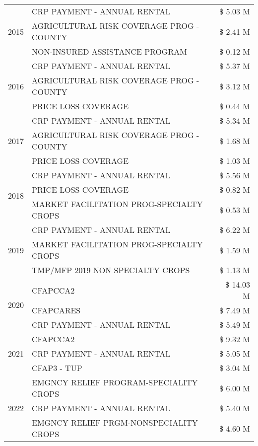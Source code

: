 \begin{tabular}{llr}
\cline{1-3}
\multirow[t]{3}{*}{2015} & CRP PAYMENT - ANNUAL RENTAL & \$ 5.03 M \\
 & AGRICULTURAL RISK COVERAGE PROG - COUNTY & \$ 2.41 M \\
 & NON-INSURED ASSISTANCE PROGRAM & \$ 0.12 M \\
\cline{1-3}
\multirow[t]{3}{*}{2016} & CRP PAYMENT - ANNUAL RENTAL & \$ 5.37 M \\
 & AGRICULTURAL RISK COVERAGE PROG - COUNTY & \$ 3.12 M \\
 & PRICE LOSS COVERAGE & \$ 0.44 M \\
\cline{1-3}
\multirow[t]{3}{*}{2017} & CRP PAYMENT - ANNUAL RENTAL & \$ 5.34 M \\
 & AGRICULTURAL RISK COVERAGE PROG - COUNTY & \$ 1.68 M \\
 & PRICE LOSS COVERAGE & \$ 1.03 M \\
\cline{1-3}
\multirow[t]{3}{*}{2018} & CRP PAYMENT - ANNUAL RENTAL & \$ 5.56 M \\
 & PRICE LOSS COVERAGE & \$ 0.82 M \\
 & MARKET FACILITATION PROG-SPECIALTY CROPS & \$ 0.53 M \\
\cline{1-3}
\multirow[t]{3}{*}{2019} & CRP PAYMENT - ANNUAL RENTAL & \$ 6.22 M \\
 & MARKET FACILITATION PROG-SPECIALTY CROPS & \$ 1.59 M \\
 & TMP/MFP 2019 NON SPECIALTY CROPS & \$ 1.13 M \\
\cline{1-3}
\multirow[t]{3}{*}{2020} & CFAPCCA2 & \$ 14.03 M \\
 & CFAPCARES & \$ 7.49 M \\
 & CRP PAYMENT - ANNUAL RENTAL & \$ 5.49 M \\
\cline{1-3}
\multirow[t]{3}{*}{2021} & CFAPCCA2 & \$ 9.32 M \\
 & CRP PAYMENT - ANNUAL RENTAL & \$ 5.05 M \\
 & CFAP3 - TUP & \$ 3.04 M \\
\cline{1-3}
\multirow[t]{3}{*}{2022} & EMGNCY RELIEF PROGRAM-SPECIALITY CROPS & \$ 6.00 M \\
 & CRP PAYMENT - ANNUAL RENTAL & \$ 5.40 M \\
 & EMGNCY RELIEF PRGM-NONSPECIALITY CROPS & \$ 4.60 M \\
\cline{1-3}
\bottomrule
\end{tabular}
